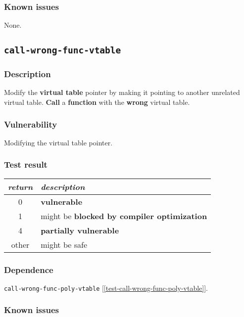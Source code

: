 \documentclass[a4paper]{book}
\begin{document}
\subsubsection{Known issues}
None.

\newpage

\subsection{\texttt{call-wrong-func-vtable}}\label{test-call-wrong-func-vtable}

\subsubsection{Description}
Modify the \textbf{virtual table} pointer by making it pointing to another unrelated virtual table.
\textbf{Call} a \textbf{function} with the \textbf{wrong} virtual table.

\subsubsection{Vulnerability}
Modifying the virtual table pointer.

\subsubsection{Test result}
\begin{tabular}{cl}
  \toprule
  \emph{return}  & \emph{description} \\
  \midrule
  0              & \textbf{vulnerable} \\
  1              & might be \textbf{blocked by compiler optimization} \\
  4              & \textbf{partially vulnerable} \\
  other          & might be safe \\
  \bottomrule
\end{tabular}
  
\subsubsection{Dependence}

\texttt{call-wrong-func-poly-vtable} [\ref{test-call-wrong-func-poly-vtable}].

\subsubsection{Known issues}
\end{document}

